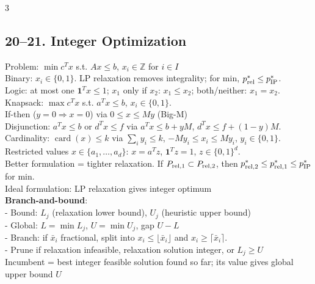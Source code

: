 \documentclass[8pt,landscape]{extarticle}
\newcommand{\1}{\mathbf{1}}
\newcommand{\0}{\mathbf{0}}
\begin{document}
\begin{multicols*}{3}
\subsection*{20--21. Integer Optimization}
Problem: $\min c^Tx$ s.t. $Ax\le b$, $x_i\in\mathbb Z$ for $i\in I$ \\
Binary: $x_i\in\{0,1\}$. LP relaxation removes integrality; for min, $p^*_{\rm rel}\le p^*_{\rm IP}$. \\
Logic: at most one $\mathbf1^Tx\le1$; $x_1$ only if $x_2$: $x_1\le x_2$; both/neither: $x_1=x_2$. \\
Knapsack: $\max c^Tx$ s.t. $a^Tx\le b$, $x_i\in\{0,1\}$. \\
If-then ($y=0\Rightarrow x=0$) via $0\le x\le My$ (Big-M) \\ 
Disjunction: $a^Tx\le b$ or $d^Tx\le f$ via $a^Tx\le b+yM$, $d^Tx\le f+(1-y)M$. \\
Cardinality: $\operatorname{card}(x)\le k$ via $\sum_i y_i\le k$, $-My_i\le x_i\le My_i$, $y_i\in\{0,1\}$. \\
Restricted values $x\in\{a_1,\ldots,a_d\}$: $x=a^Tz$, $\mathbf1^Tz=1$, $z\in\{0,1\}^d$. \\
Better formulation = tighter relaxation. If $P_{\rm rel,1}\subset P_{\rm rel,2}$, then $p^*_{\rm rel,2}\le p^*_{\rm rel,1}\le p^*_{\rm IP}$ for min. \\
Ideal formulation: LP relaxation gives integer optimum \\

\textbf{Branch-and-bound}: \\
- Bound: $L_j$ (relaxation lower bound), $U_j$ (heuristic upper bound) \\
- Global: $L=\min L_j$, $U=\min U_j$, gap $U-L$ \\
- Branch: if $\bar x_i$ fractional, split into $x_i\le\lfloor\bar x_i\rfloor$ and $x_i\ge\lceil\bar x_i\rceil$. \\
- Prune if relaxation infeasible, relaxation solution integer, or $L_j\ge U$ \\
Incumbent = best integer feasible solution found so far; its value gives global upper bound $U$\\



\end{multicols*}
\end{document}
